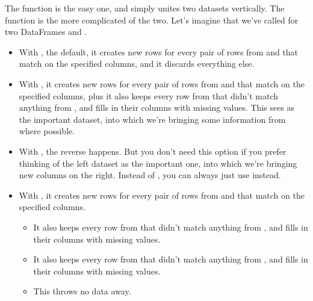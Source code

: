 \documentclass[letterpaper,10pt,english]{jupyterBook}
\begin{document}
\sphinxAtStartPar
The  function is the easy one, and simply unites two datasets vertically.  The  function is the more complicated of the two.  Let’s imagine that we’ve called  for two DataFrames  and .
\begin{itemize}
\item {} 
\sphinxAtStartPar
With , the default, it creates new rows for every pair of rows from  and  that match on the specified columns, and it discards everything else.

\item {} 
\sphinxAtStartPar
With , it creates new rows for every pair of rows from  and  that match on the specified columns, plus it also keeps every row from  that didn’t match anything from , and fills in their  columns with missing values.  This sees  as the important dataset, into which we’re bringing some information from  where possible.

\item {} 
\sphinxAtStartPar
With , the reverse happens.  But you don’t need this option if you prefer thinking of the left dataset as the important one, into which we’re bringing new columns on the right.  Instead of , you can always just use  instead.

\item {} 
\sphinxAtStartPar
With , it creates new rows for every pair of rows from  and  that match on the specified columns.
\begin{itemize}
\item {} 
\sphinxAtStartPar
It also keeps every row from  that didn’t match anything from , and fills in their  columns with missing values.

\item {} 
\sphinxAtStartPar
It also keeps every row from  that didn’t match anything from , and fills in their  columns with missing values.

\item {} 
\sphinxAtStartPar
This throws no data away.

\end{itemize}

\end{itemize}
\end{document}
